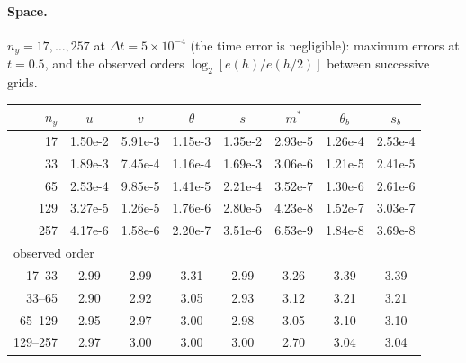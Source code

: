 \documentclass[11pt,a4paper]{article}
\begin{document}
\paragraph{Space.} $n_y = 17,\dots,257$ at $\Delta t = 5\times10^{-4}$ (the time error is negligible):
maximum errors at $t=0.5$, and the observed orders $\log_2[e(h)/e(h/2)]$ between successive grids.
\begin{center}
\small
\begin{tabular}{rccccccc}
\toprule
$n_y$ & $u$ & $v$ & $\theta$ & $s$ & $m^*$ & $\theta_b$ & $s_b$ \\
\midrule
 17 & 1.50e-2 & 5.91e-3 & 1.15e-3 & 1.35e-2 & 2.93e-5 & 1.26e-4 & 2.53e-4 \\
 33 & 1.89e-3 & 7.45e-4 & 1.16e-4 & 1.69e-3 & 3.06e-6 & 1.21e-5 & 2.41e-5 \\
 65 & 2.53e-4 & 9.85e-5 & 1.41e-5 & 2.21e-4 & 3.52e-7 & 1.30e-6 & 2.61e-6 \\
129 & 3.27e-5 & 1.26e-5 & 1.76e-6 & 2.80e-5 & 4.23e-8 & 1.52e-7 & 3.03e-7 \\
257 & 4.17e-6 & 1.58e-6 & 2.20e-7 & 3.51e-6 & 6.53e-9 & 1.84e-8 & 3.69e-8 \\
\midrule
\multicolumn{8}{l}{observed order} \\
17--33   & 2.99 & 2.99 & 3.31 & 2.99 & 3.26 & 3.39 & 3.39 \\
33--65   & 2.90 & 2.92 & 3.05 & 2.93 & 3.12 & 3.21 & 3.21 \\
65--129  & 2.95 & 2.97 & 3.00 & 2.98 & 3.05 & 3.10 & 3.10 \\
129--257 & 2.97 & 3.00 & 3.00 & 3.00 & 2.70 & 3.04 & 3.04 \\
\bottomrule
\end{tabular}
\end{center}
\end{document}
